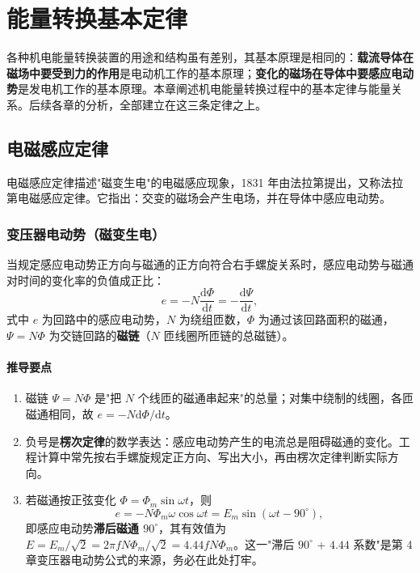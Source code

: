 \chapter{能量转换基本定律}

各种机电能量转换装置的用途和结构虽有差别，其基本原理是相同的：\textbf{载流导体在磁场中要受到力的作用}是电动机工作的基本原理；\textbf{变化的磁场在导体中要感应电动势}是发电机工作的基本原理。本章阐述机电能量转换过程中的基本定律与能量关系。后续各章的分析，全部建立在这三条定律之上。

\section{电磁感应定律}

电磁感应定律描述"磁变生电"的电磁感应现象，1831 年由法拉第提出，又称法拉第电磁感应定律。它指出：交变的磁场会产生电场，并在导体中感应电动势。

\subsection{变压器电动势（磁变生电）}
当规定感应电动势正方向与磁通的正方向符合右手螺旋关系时，感应电动势与磁通对时间的变化率的负值成正比：
\begin{equation}
e=-N\frac{\mathrm{d}\Phi}{\mathrm{d}t}=-\frac{\mathrm{d}\Psi}{\mathrm{d}t},
\end{equation}
式中 $e$ 为回路中的感应电动势，$N$ 为绕组匝数，$\Phi$ 为通过该回路面积的磁通，$\Psi=N\Phi$ 为交链回路的\textbf{磁链}（$N$ 匝线圈所匝链的总磁链）。


\subsubsection{推导要点}
\begin{enumerate}
  \item 磁链 $\Psi=N\Phi$ 是"把 $N$ 个线匝的磁通串起来"的总量；对集中绕制的线圈，各匝磁通相同，故 $e=-N\mathrm{d}\Phi/\mathrm{d}t$。
  \item 负号是\textbf{楞次定律}的数学表达：感应电动势产生的电流总是阻碍磁通的变化。工程计算中常先按右手螺旋规定正方向、写出大小，再由楞次定律判断实际方向。
  \item 若磁通按正弦变化 $\Phi=\Phi_m\sin\omega t$，则
  \begin{equation}
  e=-N\Phi_m\omega\cos\omega t=E_m\sin\!\left(\omega t-90^\circ\right),
  \end{equation}
  即感应电动势\textbf{滞后磁通 $90^\circ$}，其有效值为 $E=E_m/\sqrt2=2\pi fN\Phi_m/\sqrt2=4.44fN\Phi_m$。这一"滞后 $90^\circ$ + $4.44$ 系数"是第 4 章变压器电动势公式的来源，务必在此处打牢。
\end{enumerate}

